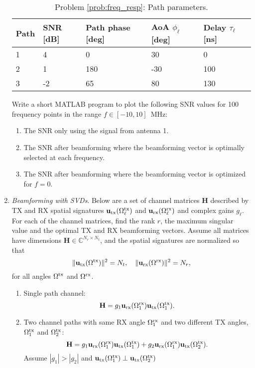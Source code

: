 \documentclass[11pt]{article}
\def\C{{\mathbb{C}}}
\newcommand{\ubf}{\mathbf{u}}
\newcommand{\Hbf}{\mathbf{H}}
\begin{document}
\begin{enumerate}
\begin{table}
\centering
\footnotesize
\begin{tabular}{|l|l|l|l|l|}
\hline
Path & SNR [dB] & Path phase [deg] & AoA $\phi_\ell$ [deg] & Delay $\tau_\ell$ [ns]  \\ \hline
1 & 4 & 0 & 30 & 0 \\ \hline
2 & 1 & 180 & -30 & 100 \\ \hline
3 & -2 & 65 & 80 & 130 \\ \hline
\end{tabular}
\caption{Problem \ref{prob:freq_resp}:  Path parameters.}
\label{tab:freq_resp}
\end{table}

Write a short MATLAB program to plot the following SNR values for 100
frequency points in the range $f \in [-10,10]$\, \si{MHz}:
\begin{enumerate}[label=(\alph*)]
\item The SNR only using the signal from antenna 1.
\item The SNR after beamforming where the beamforming vector is optimally selected at each
frequency.
\item The SNR after beamforming where the beamforming vector is optimized for $f=0$.
\end{enumerate}

\item \emph{Beamforming with SVDs}.  Below are a set of channel matrices $\Hbf$
described by TX and RX spatial signatures $\ubf_{\rm tx}(\Omega^{\rm tx}_\ell)$
and $\ubf_{\rm rx}(\Omega^{\rm rx}_\ell)$ and complex gains
$g_\ell$.
For each of the  channel matrices,
find the rank $r$, the maximum singular value and the optimal TX and RX 
beamforming vectors.  Assume all matrices have dimensions
 $\Hbf \in \C^{N_r \times N_t}$,
and the spatial signatures are normalized so that 
\[
    \|\ubf_{\rm tx}(\Omega^{\rm tx})\|^2=N_t, \quad
    \|\ubf_{\rm rx}(\Omega^{\rm rx})\|^2=N_r,
\]
for all angles $\Omega^{\rm tx}$ and $\Omega^{\rm rx}$.
\begin{enumerate}[label=(\alph*)]
\item Single path channel:
\[
    \Hbf = g_1 
        \ubf_{\rm rx}(\Omega_1^{\rm rx}) \ubf_{\rm tx}(\Omega_1^{\rm tx}).
\]
\item Two channel paths with same RX angle $\Omega_1^{\rm rx}$ 
and two different TX angles, $\Omega_1^{\rm tx}$ and $\Omega_2^{\rm tx}$:
\[
    \Hbf = g_1
        \ubf_{\rm rx}(\Omega_1^{\rm rx}) \ubf_{\rm tx}(\Omega_1^{\rm tx}) +
        g_2 \ubf_{\rm rx}(\Omega_1^{\rm rx}) \ubf_{\rm tx}(\Omega_2^{\rm tx}).
\]
Assume $|g_1| > |g_2|$ and $\ubf_{\rm tx}(\Omega_1^{\rm tx}) \perp \ubf_{\rm tx}(\Omega_2^{\rm tx})$


\end{enumerate}
\end{enumerate}
\end{document}
